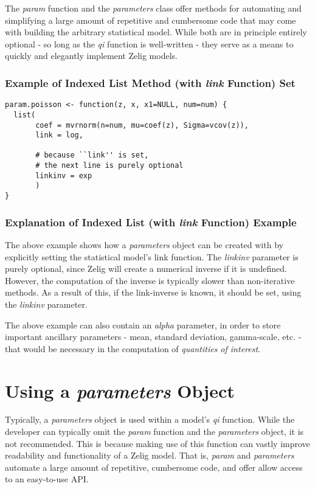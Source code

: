The \emph{param} function and the \emph{parameters} class offer methods for automating and simplifying a large amount of repetitive and cumbersome code that may come with building the arbitrary statistical model.  While both are in principle entirely optional - so long as the \emph{qi} function is well-written - they serve as a means to quickly and elegantly implement Zelig models.


\subsubsection{Example of Indexed List Method (with \emph{link} Function) Set}

\begin{verbatim}
param.poisson <- function(z, x, x1=NULL, num=num) {
  list(
       coef = mvrnorm(n=num, mu=coef(z), Sigma=vcov(z)),
       link = log,
             
       # because ``link'' is set,
       # the next line is purely optional
       linkinv = exp
       )
}
\end{verbatim}

\subsubsection{Explanation of Indexed List (with \emph{link} Function) Example}

The above example shows how a \emph{parameters} object can be created with by explicitly setting the statistical model's link function.  The \emph{linkinv} parameter is purely optional, since Zelig will create a numerical inverse if it is undefined.  However, the computation of the inverse is typically slower than non-iterative methods.  As a result of this, if the link-inverse is known, it should be set, using the \emph{linkinv} parameter.

The above example can also contain an \emph{alpha} parameter, in order to store important ancillary parameters - mean, standard deviation, gamma-scale, etc. - that would be necessary in the computation of \emph{quantities of interest}.


%
\section{Using a \emph{parameters} Object}

Typically, a \emph{parameters} object is used within a model's \emph{qi} function.  While the developer can typically omit the \emph{param} function and the \emph{parameters} object, it is not recommended.  This is because making use of this function can vastly improve readability and functionality of a Zelig model.  That is, \emph{param} and \emph{parameters} automate a large amount of repetitive, cumbersome code, and offer allow access to an easy-to-use API.


